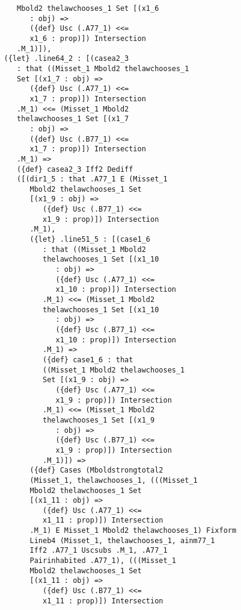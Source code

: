 \documentclass[12pt]{article}
\begin{document}
\begin{verbatim}
             Mbold2 thelawchooses_1 Set [(x1_6 
                : obj) => 
                ({def} Usc (.A77_1) <<= 
                x1_6 : prop)]) Intersection 
             .M_1)]), 
          ({let} .line64_2 : [(casea2_3 
             : that ((Misset_1 Mbold2 thelawchooses_1 
             Set [(x1_7 : obj) => 
                ({def} Usc (.A77_1) <<= 
                x1_7 : prop)]) Intersection 
             .M_1) <<= (Misset_1 Mbold2 
             thelawchooses_1 Set [(x1_7 
                : obj) => 
                ({def} Usc (.B77_1) <<= 
                x1_7 : prop)]) Intersection 
             .M_1) => 
             ({def} casea2_3 Iff2 Dediff 
             ([(dir1_5 : that .A77_1 E (Misset_1 
                Mbold2 thelawchooses_1 Set 
                [(x1_9 : obj) => 
                   ({def} Usc (.B77_1) <<= 
                   x1_9 : prop)]) Intersection 
                .M_1), 
                ({let} .line51_5 : [(case1_6 
                   : that ((Misset_1 Mbold2 
                   thelawchooses_1 Set [(x1_10 
                      : obj) => 
                      ({def} Usc (.A77_1) <<= 
                      x1_10 : prop)]) Intersection 
                   .M_1) <<= (Misset_1 Mbold2 
                   thelawchooses_1 Set [(x1_10 
                      : obj) => 
                      ({def} Usc (.B77_1) <<= 
                      x1_10 : prop)]) Intersection 
                   .M_1) => 
                   ({def} case1_6 : that 
                   ((Misset_1 Mbold2 thelawchooses_1 
                   Set [(x1_9 : obj) => 
                      ({def} Usc (.A77_1) <<= 
                      x1_9 : prop)]) Intersection 
                   .M_1) <<= (Misset_1 Mbold2 
                   thelawchooses_1 Set [(x1_9 
                      : obj) => 
                      ({def} Usc (.B77_1) <<= 
                      x1_9 : prop)]) Intersection 
                   .M_1)]) => 
                ({def} Cases (Mboldstrongtotal2 
                (Misset_1, thelawchooses_1, (((Misset_1 
                Mbold2 thelawchooses_1 Set 
                [(x1_11 : obj) => 
                   ({def} Usc (.A77_1) <<= 
                   x1_11 : prop)]) Intersection 
                .M_1) E Misset_1 Mbold2 thelawchooses_1) Fixform 
                Lineb4 (Misset_1, thelawchooses_1, ainm77_1 
                Iff2 .A77_1 Uscsubs .M_1, .A77_1 
                Pairinhabited .A77_1), (((Misset_1 
                Mbold2 thelawchooses_1 Set 
                [(x1_11 : obj) => 
                   ({def} Usc (.B77_1) <<= 
                   x1_11 : prop)]) Intersection 

\end{verbatim}
\end{document}
